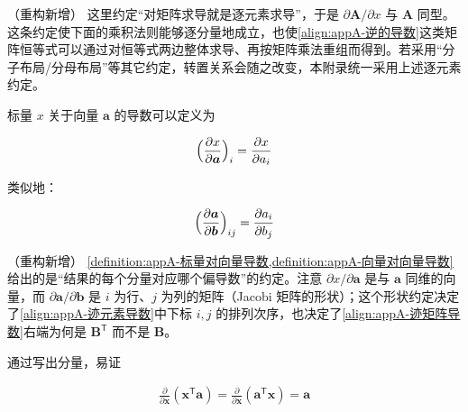 \documentclass[../main.tex]{subfiles}
\begin{document}
\begin{remark}（重构新增）
这里约定“对矩阵求导就是逐元素求导”，于是 $\partial\bm{A}/\partial x$ 与 $\bm{A}$ 同型。这条约定使下面的乘积法则能够逐分量地成立，也使\eqref{align:appA-逆的导数}这类矩阵恒等式可以通过对恒等式两边整体求导、再按矩阵乘法重组而得到。若采用“分子布局/分母布局”等其它约定，转置关系会随之改变，本附录统一采用上述逐元素约定。
\end{remark}

标量 $x$ 关于向量 $\bm{a}$ 的导数可以定义为
\begin{definition}[标量关于向量的导数]\label{definition:appA-标量对向量导数}
\begin{align}
  \Bigl(\frac{\partial x}{\partial\bm{a}}\Bigr)_i=\frac{\partial x}{\partial a_i}
  \label{align:appA-标量对向量导数}
\end{align}
\end{definition}

类似地：
\begin{definition}[向量关于向量的导数]\label{definition:appA-向量对向量导数}
\begin{align}
  \Bigl(\frac{\partial\bm{a}}{\partial\bm{b}}\Bigr)_{ij}=\frac{\partial a_i}{\partial b_j}
  \label{align:appA-向量对向量导数}
\end{align}
\end{definition}

\begin{remark}（重构新增）
\cref{definition:appA-标量对向量导数,definition:appA-向量对向量导数}给出的是“结果的每个分量对应哪个偏导数”的约定。注意 $\partial x/\partial\bm{a}$ 是与 $\bm{a}$ 同维的向量，而 $\partial\bm{a}/\partial\bm{b}$ 是 $i$ 为行、$j$ 为列的矩阵（Jacobi 矩阵的形状）；这个形状约定决定了\eqref{align:appA-迹元素导数}中下标 $i,j$ 的排列次序，也决定了\eqref{align:appA-迹矩阵导数}右端为何是 $\bm{B}^{\mathsf{T}}$ 而不是 $\bm{B}$。
\end{remark}

通过写出分量，易证
\begin{proposition}[线性型的导数]\label{proposition:appA-线性型导数}
\begin{align}
  \frac{\partial}{\partial\bm{x}}(\bm{x}^{\mathsf{T}}\bm{a})=\frac{\partial}{\partial\bm{x}}(\bm{a}^{\mathsf{T}}\bm{x})=\bm{a}
  \label{align:appA-线性型}
\end{align}
\end{proposition}
\end{document}
